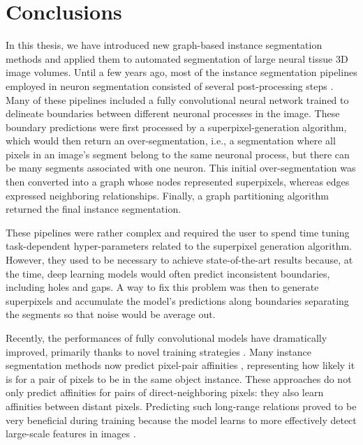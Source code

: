 

\chapter*{Conclusions}
In this thesis, we have introduced new graph-based instance segmentation methods and applied them to automated segmentation of large neural tissue 3D image volumes. 
Until a few years ago, most of the instance segmentation pipelines employed in neuron segmentation consisted of several post-processing steps \cite{lee2017superhuman,funke2018large,beier2017multicut,funke2018candidate,pape2017solving,meirovitch2016multi,liu2016sshmt}. Many of these pipelines included a fully convolutional neural network trained to delineate boundaries between different neuronal processes in the image. These boundary predictions were first processed by a superpixel-generation algorithm, which would then return an over-segmentation, i.e., a segmentation where all pixels in an image's segment belong to the same neuronal process, but there can be many segments associated with one neuron. This initial over-segmentation was then converted into a graph whose nodes represented superpixels, whereas edges expressed neighboring relationships. Finally, a graph partitioning algorithm returned the final instance segmentation. 

These pipelines were rather complex and required the user to spend time tuning task-dependent hyper-parameters related to the superpixel generation algorithm. However, they used to be necessary to achieve state-of-the-art results because, at the time, deep learning models would often predict inconsistent boundaries, including holes and gaps. A way to fix this problem was then to generate superpixels and accumulate the model's predictions along boundaries separating the segments so that noise would be average out. 

Recently, the performances of fully convolutional models have dramatically improved, primarily thanks to novel training strategies \cite{lee2017superhuman,milletari2016v}. Many instance segmentation methods now predict pixel-pair affinities \cite{Gao_2019_ICCV,liu2018affinity,lee2017superhuman}, representing how likely it is for a pair of pixels to be in the same object instance. These approaches do not only predict affinities for pairs of direct-neighboring pixels: they also learn affinities between distant pixels. Predicting such long-range relations proved to be very beneficial during training because the model learns to more effectively detect large-scale features in images \cite{lee2017superhuman}. 

